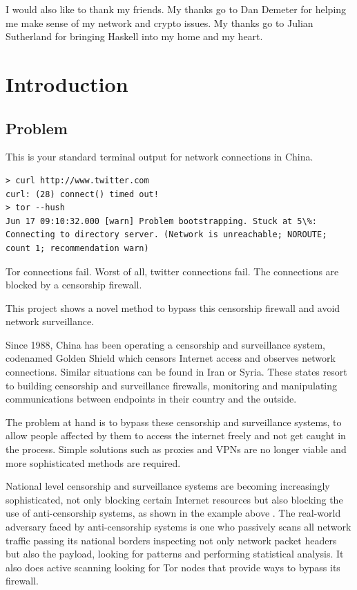 \documentclass[11pt]{book} %
\begin{document}
I would also like to thank my friends. My thanks go to Dan Demeter for helping me make sense of my network and crypto issues. My thanks go to Julian Sutherland for bringing Haskell into my home and my heart.

\listoftodos

\tableofcontents

\newpage



\chapter{Introduction}

\section{Problem}



This is your standard terminal output for network connections in China.
\begin{lstlisting}
> curl http://www.twitter.com
curl: (28) connect() timed out!
> tor --hush
Jun 17 09:10:32.000 [warn] Problem bootstrapping. Stuck at 5\%: Connecting to directory server. (Network is unreachable; NOROUTE; count 1; recommendation warn)
\end{lstlisting}
Tor connections fail. Worst of all, twitter connections fail. The connections are blocked by a censorship firewall.

This project shows a novel method to bypass this censorship firewall and avoid network surveillance.

Since 1988, China has been operating a censorship and surveillance system, codenamed Golden Shield which censors Internet access and observes network connections. Similar situations can be found in Iran or Syria. These states resort to building censorship and surveillance firewalls, monitoring and manipulating communications between endpoints in their country and the outside.

The problem at hand is to bypass these censorship and surveillance systems, to allow people affected by them to access the internet freely and not get caught in the process. Simple solutions such as proxies and VPNs are no longer viable and more sophisticated methods are required.

National level censorship and surveillance systems are becoming increasingly sophisticated, not only blocking certain Internet resources but also blocking the use of anti-censorship systems, as shown in the example above \citep*{winterInChina}. The real-world adversary faced by anti-censorship systems is one who passively scans all network traffic passing its national borders inspecting not only network packet headers but also the payload, looking for patterns and performing statistical analysis. It also does active scanning looking for Tor nodes that provide ways to bypass its firewall.
\end{document}
